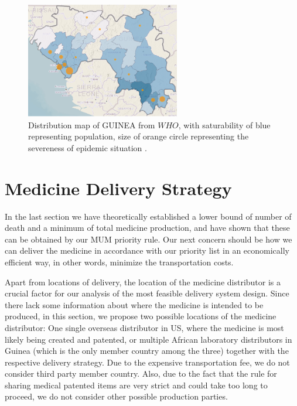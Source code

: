 \documentclass[12pt,a4paper,titlepage]{article}
\begin{document}
\begin{figure}[htbp]
    \centering
    \label{img_vfit}
    \includegraphics[width=0.6\textwidth]{figures/imgSpreadMapG.png}
    \caption{Distribution map of GUINEA from $WHO$, with saturability of blue representing population, size of orange circle representing the severeness of epidemic situation
.}
\end{figure}




\section{Medicine Delivery Strategy}

In the last section we have theoretically established a lower bound of number of death and a minimum of total medicine production, and have shown that these can be obtained by our MUM priority rule. Our next concern should be how we can deliver the medicine in accordance with our priority list in an economically efficient way, in other words, minimize the transportation costs.

Apart from locations of delivery, the location of the medicine distributor is a crucial factor for our analysis of the most feasible delivery system design. Since there lack some information about where the medicine is intended to be produced, in this section, we propose two possible locations of the medicine distributor: One single overseas distributor in US, where the medicine is most likely being created and patented, or multiple African laboratory distributors in Guinea (which is the only member country among the three) together with the respective delivery strategy. Due to the expensive transportation fee, we do not consider third party member country. Also, due to the fact that  the rule for sharing medical patented items are very strict and could take too long to proceed, we do not consider other possible production parties.
\end{document}
